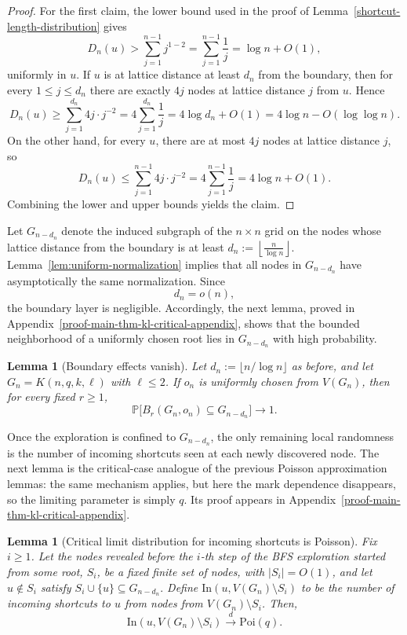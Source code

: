\documentclass[10pt]{amsart}
\newtheorem{lemma}[theorem]{Lemma}
\begin{document}
\begin{proof}
For the first claim, the lower bound used in the proof of Lemma~\ref{shortcut-length-distribution} gives
\[
D_n(u)>
\sum_{j=1}^{n-1} j^{1-2}
=\sum_{j=1}^{n-1}\frac1j
=\log n+O(1),
\]
uniformly in \(u\). If \(u\) is at lattice distance at least \(d_n\) from the boundary, then for every \(1\le j\le d_n\) there are exactly \(4j\) nodes at lattice distance \(j\) from \(u\). Hence
\[
D_n(u)\ge \sum_{j=1}^{d_n} 4j\cdot j^{-2}
=4\sum_{j=1}^{d_n}\frac1j
=4\log d_n+O(1)
=4\log n-O(\log\log n).
\]
On the other hand, for every \(u\), there are at most \(4j\) nodes at lattice distance \(j\), so
\[
D_n(u)\le \sum_{j=1}^{n-1} 4j\cdot j^{-2}
=4\sum_{j=1}^{n-1}\frac1j
=4\log n+O(1).
\]
Combining the lower and upper bounds yields the claim.
\end{proof}

Let \(G_{n-d_n}\) denote the induced subgraph of the \(n\times n\) grid on the nodes whose lattice distance from the boundary is at least
\(
d_n:=\left\lfloor \frac{n}{\log n}\right\rfloor .
\)
Lemma~\ref{lem:uniform-normalization} implies that all nodes in \(G_{n-d_n}\) have asymptotically the same normalization. Since
\[
d_n=o(n),
\]
the boundary layer is negligible. Accordingly, the next lemma, proved in Appendix~\ref{proof-main-thm-kl-critical-appendix}, shows that the bounded neighborhood of a uniformly chosen root lies in \(G_{n-d_n}\) with high probability.

\begin{lemma}[Boundary effects vanish]
\label{lem:boundary-avoidance}
Let \(d_n:=\lfloor n/\log n\rfloor\) as before, and let
\(G_n=K(n,q,k,\ell)\) with \(\ell\le 2\). If \(o_n\) is uniformly chosen from
\(V(G_n)\), then for every fixed \(r\ge 1\),
\[
    \mathbb P\bigl[B_r(G_n,o_n)\subseteq G_{n-d_n}\bigr]\to 1 .
\]
\end{lemma}

Once the exploration is confined to \(G_{n-d_n}\), the only remaining local randomness is the number of incoming shortcuts seen at each newly discovered node. The next lemma is the critical-case analogue of the previous Poisson approximation lemmas: the same mechanism applies, but here the mark dependence disappears, so the limiting parameter is simply \(q\). Its proof appears in Appendix~\ref{proof-main-thm-kl-critical-appendix}.

\begin{lemma}[Critical limit distribution for incoming shortcuts is Poisson]\label{lem:critical-poisson-input}
Fix \(i\ge 1\). Let the nodes revealed before the \(i\)-th step of the BFS exploration started from some root, \(S_i\), be a fixed finite set of nodes,
with \(|S_i|=O(1)\), and let \(u\notin S_i\) satisfy
\(
S_i\cup\{u\}\subseteq G_{n-d_n}.
\) Define
\(
\mathrm{In}(u,V(G_n)\setminus S_i)
\)
to be the number of incoming shortcuts to \(u\) from nodes from \(V(G_n)\setminus S_i\). Then, 
\[
\mathrm{In}(u,V(G_n)\setminus S_i)\xrightarrow{d}\mathrm{Poi}(q).
\]
\end{lemma}
\end{document}
